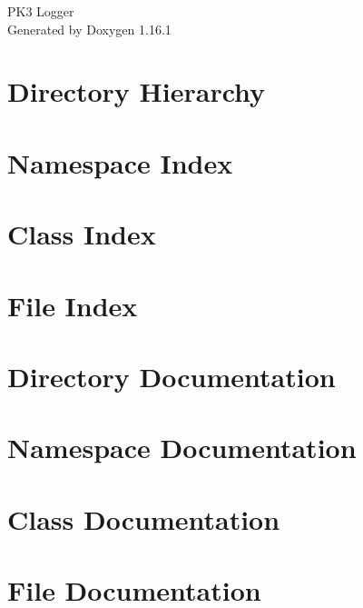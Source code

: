 \documentclass[twoside]{book}
\newcommand{\+}{\discretionary{\mbox{\scriptsize$\hookleftarrow$}}{}{}}
\newcommand{\clearemptydoublepage}{%
    \newpage{\pagestyle{empty}\cleardoublepage}%
  }
\begin{document}
  \raggedbottom
    \hypersetup{pageanchor=false,
                bookmarksnumbered=true,
                pdfencoding=unicode
               }
  \begin{titlepage}
  \vspace*{7cm}
  \begin{center}%
  {\Large PK3 Logger}\\
  \vspace*{1cm}
  {\large Generated by Doxygen 1.16.1}\\
  \end{center}
  \end{titlepage}
  \clearemptydoublepage
  \tableofcontents
  \clearemptydoublepage
  \hypersetup{pageanchor=true}
\chapter{Directory Hierarchy}

\chapter{Namespace Index}

\chapter{Class Index}

\chapter{File Index}

\chapter{Directory Documentation}

\chapter{Namespace Documentation}



\chapter{Class Documentation}






\chapter{File Documentation}









  \backmatter
  \newpage
  \clearemptydoublepage
  \printindex
\end{document}
